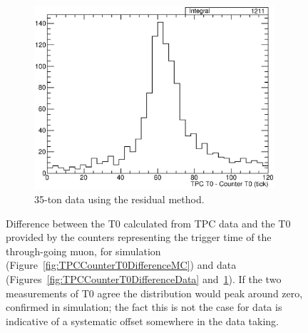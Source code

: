 \begin{figure}
\begin{subfigure}[t]{0.48\linewidth}
    \includegraphics[width=0.98\textwidth]{TPCCounterT0DifferenceDataResidual.eps}
    \caption{35-ton data using the residual method.}
    \label{fig:TPCCounterT0DifferenceDataResidual}
  \end{subfigure}
  \caption[Difference between the T0 calculated from TPC data and the T0 provided by the counters representing the trigger time of the through-going muon, for simulation and data.]{Difference between the T0 calculated from TPC data and the T0 provided by the counters representing the trigger time of the through-going muon, for simulation (Figure~\ref{fig:TPCCounterT0DifferenceMC}) and data (Figures~\ref{fig:TPCCounterT0DifferenceData} and~\ref{fig:TPCCounterT0DifferenceDataResidual}).  If the two measurements of T0 agree the distribution would peak around zero, confirmed in simulation; the fact this is not the case for data is indicative of a systematic offset somewhere in the data taking.}
  \label{fig:TPCCounterT0Difference}
\end{figure}

